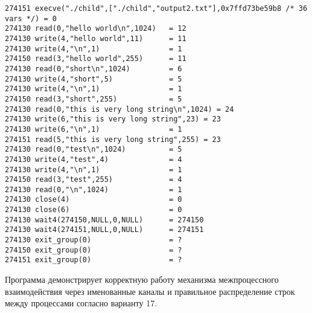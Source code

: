 \begin{verbatim}
274151 execve("./child",["./child","output2.txt"],0x7ffd73be59b8 /* 36 vars */) = 0
274130 read(0,"hello world\n",1024)   = 12
274130 write(4,"hello world",11)      = 11
274130 write(4,"\n",1)                = 1
274150 read(3,"hello world",255)      = 11
274130 read(0,"short\n",1024)         = 6
274130 write(4,"short",5)             = 5
274130 write(4,"\n",1)                = 1
274150 read(3,"short",255)            = 5
274130 read(0,"this is very long string\n",1024) = 24
274130 write(6,"this is very long string",23) = 23
274130 write(6,"\n",1)                = 1
274151 read(5,"this is very long string",255) = 23
274130 read(0,"test\n",1024)          = 5
274130 write(4,"test",4)              = 4
274130 write(4,"\n",1)                = 1
274150 read(3,"test",255)             = 4
274130 read(0,"\n",1024)              = 1
274130 close(4)                       = 0
274130 close(6)                       = 0
274130 wait4(274150,NULL,0,NULL)      = 274150
274130 wait4(274151,NULL,0,NULL)      = 274151
274130 exit_group(0)                  = ?
274150 exit_group(0)                  = ?
274151 exit_group(0)                  = ?
\end{verbatim}

Программа демонстрирует корректную работу механизма межпроцессного взаимодействия через именованные каналы и правильное распределение строк между процессами согласно варианту 17.